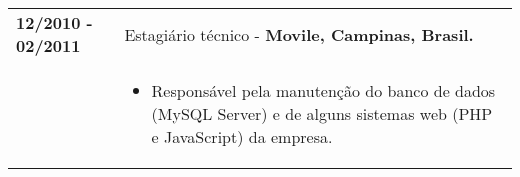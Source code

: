 \documentclass[10pt, a4paper]{article}
\begin{document}
\begin{tabular}{p{} p{}}
\textbf{12/2010 - 02/2011} & Estagiário técnico - \textbf{Movile,
Campinas, Brasil.}
\\  &  \vspace{-12pt}
\begin{itemize} 
\item Responsável pela manutenção do banco de dados (MySQL Server) e de
alguns sistemas web (PHP e JavaScript) da empresa.
\end{itemize}
\end{tabular}
\vspace{-12pt}


% 
% 
% 

\end{document}
